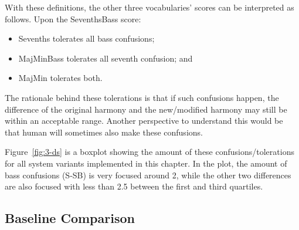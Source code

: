 With these definitions, the other three vocabularies' scores can be interpreted as follows. Upon the SeventhsBass score:
\begin{itemize}
	\item Sevenths tolerates all bass confusions;
	\item MajMinBass tolerates all seventh confusion; and
	\item MajMin tolerates both.
\end{itemize}
The rationale behind these tolerations is that if such confusions happen, the difference of the original harmony and the new/modified harmony may still be within an acceptable range. Another perspective to understand this would be that human will sometimes also make these confusions.

Figure~\ref{fig:3-ds} is a boxplot showing the amount of these confusions/tolerations for all system variants implemented in this chapter. In the plot, the amount of bass confusions (S-SB) is very focused around 2, while the other two differences are also focused with less than 2.5 between the first and third quartiles.

\subsection{Baseline Comparison} \label{sec:3-p9}

